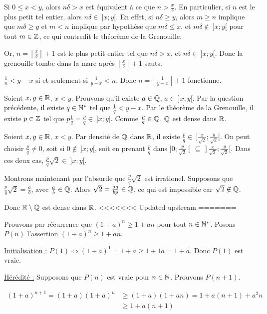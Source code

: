 \documentclass[]{../templates/homework}
\providecommand{\floor}[1]{\left \lfloor #1 \right \rfloor }
\begin{document}
\question Si $0 \leq x <y$, alors $n\delta > x$ est équivalent à ce que $n> \frac x \delta$. En particulier, si $n$ est le plus petit tel entier, alors $n\delta \in \ ]x;y[$. En effet, si $n\delta \geq y$, alors $m\geq n$ implique que $m\delta \geq y$ et $m < n$ implique par hypothèse que $m\delta \leq x$, et $m\delta \not\in\ ]x;y[$ pour tout $m\in\mathbb Z$, ce qui contredit le théorème de la Grenouille.

Or, $n = \floor {\frac x \delta} + 1$ est le plus petit entier tel que $n\delta > x$, et $n\delta \in\ ]x;y[$. Donc la grenouille tombe dans la mare après $\floor {\frac x \delta} + 1$ sauts.

\subproblem
\question $\frac 1 n < y-x$ si et seulement si $\frac 1 {y-x} < n$. Donc $n=\floor {\frac 1 {y-x}} + 1$ fonctionne.

\question Soient $x,y \in \mathbb R$, $x<y$. Prouvons qu'il existe $a\in\mathbb Q$, $a\in\ ]x;y[$.
Par la question précédente, il existe $q\in \mathbb N^*$ tel que $\frac 1 q < y-x$. Par le théorème de la Grenouille, il existe $p \in \mathbb Z$ tel que $p \frac 1 q = \frac p q \in \ ]x;y[$. Comme $\frac p q \in \mathbb Q$, $\mathbb Q$ est dense dans $\mathbb R$.

\question Soient $x,y \in \mathbb R$, $x<y$. Par densité de $\mathbb Q$ dans $\mathbb R$, il existe $\frac p q \in\ ]\frac x {\sqrt 2}; \frac y {\sqrt 2}[$. On peut choisir $\frac p q \neq 0$, soit si $0\not \in\ ]x;y[$, soit en prenant $\frac p q$ dans $]0;\frac y {\sqrt 2}[\ \subseteq\ ]\frac x {\sqrt 2}; \frac y {\sqrt 2}[$. Dans ces deux cas, $\frac p q \sqrt 2 \in\ ]x;y[$.

Montrons maintenant par l'absurde que $\frac p q \sqrt 2$ est irrationel. Supposons que $\frac p q \sqrt 2 = \frac a b$, avec $\frac a b \in \mathbb Q$. Alors $\sqrt 2 = \frac {aq} {bp} \in \mathbb Q$, ce qui est impossible car $\sqrt 2 \not \in \mathbb Q$.

Donc $\mathbb R \setminus \mathbb Q$ est dense dans $\mathbb R$.
<<<<<<< Updated upstream
=======

\subproblem
\question Prouvons par récurrence que $(1+a)^n \geq 1+an$ pour tout $n \in \mathbb N^*$. Posons $P(n)$ l'assertion $(1+a)^n\geq 1+an$.

\underline{Initialisation :} $P(1) \iff (1+a)^1 = 1+a \geq 1+ 1a = 1+a$. Donc $P(1)$ est vraie.

\underline{Hérédité :} Supposons que $P(n)$ est vraie pour $n\in\mathbb N$. Prouvons $P(n+1)$.

\begin{align*}
	(1+a)^{n+1} = (1+a)(1+a)^n & \geq (1+a)(1+an) = 1 + a(n+1) + a^2n \\
	& \geq 1 + a(n+1)
\end{align*}
\end{document}
